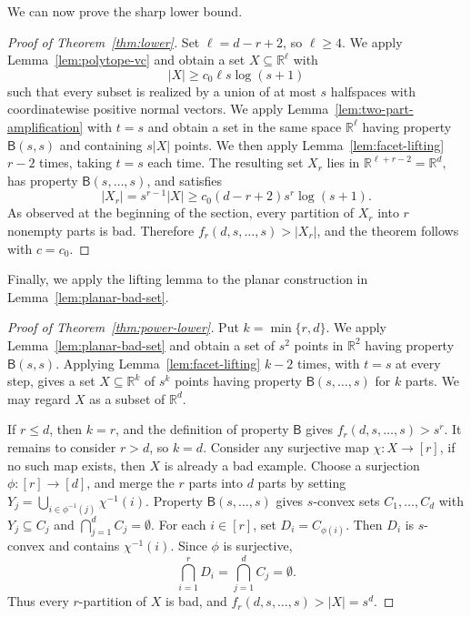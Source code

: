 \documentclass[11pt]{article}
\theoremstyle{definition}
\newcommand*{\abs}[1]{\lvert#1\rvert}
\newcommand{\R}{\mathbb{R}}
\begin{document}
We can now prove the sharp lower bound.

\begin{proof}[Proof of Theorem~\ref{thm:lower}]
Set \(\ell=d-r+2\), so \(\ell\ge4\). We apply Lemma~\ref{lem:polytope-vc} and obtain a set \(X\subseteq\R^{\ell}\) with
\[
\abs{X}\ge c_{0}\ell s\log(s+1)
\]
such that every subset is realized by a union of at most \(s\) halfspaces with coordinatewise positive normal vectors. We apply Lemma~\ref{lem:two-part-amplification} with \(t=s\) and obtain a set in the same space \(\R^{\ell}\) having property \(\mathsf{B}(s,s)\) and containing \(s\abs{X}\) points. We then apply Lemma~\ref{lem:facet-lifting} \(r-2\) times, taking \(t=s\) each time. The resulting set \(X_{r}\) lies in
\(
\R^{\ell+r-2}=\R^{d},
\)
has property \(\mathsf{B}(s,\ldots,s)\), and satisfies
\[
\abs{X_{r}}=s^{r-1}\abs{X}\ge c_{0}(d-r+2)s^{r}\log(s+1).
\]
As observed at the beginning of the section, every partition of \(X_{r}\) into \(r\) nonempty parts is bad. Therefore \(f_{r}(d,s,\ldots,s)>\abs{X_{r}}\), and the theorem follows with \(c=c_{0}\).
\end{proof}

Finally, we apply the lifting lemma to the planar construction in Lemma~\ref{lem:planar-bad-set}.

\begin{proof}[Proof of Theorem~\ref{thm:power-lower}]
Put \(k=\min\{r,d\}\). We apply Lemma~\ref{lem:planar-bad-set} and obtain a set of \(s^{2}\) points in \(\R^{2}\) having property \(\mathsf{B}(s,s)\). Applying Lemma~\ref{lem:facet-lifting} \(k-2\) times, with \(t=s\) at every step, gives a set \(X\subseteq\R^{k}\) of \(s^{k}\) points having property \(\mathsf{B}(s,\ldots,s)\) for \(k\) parts. We may regard \(X\) as a subset of \(\R^{d}\).

If \(r\le d\), then \(k=r\), and the definition of property \(\mathsf{B}\) gives \(f_{r}(d,s,\ldots,s)>s^{r}\). It remains to consider \(r>d\), so \(k=d\). Consider any surjective map \(\chi:X\to[r]\), if no such map exists, then \(X\) is already a bad example. Choose a surjection \(\phi:[r]\to[d]\), and merge the \(r\) parts into \(d\) parts by setting \(Y_{j}=\bigcup_{i\in\phi^{-1}(j)}\chi^{-1}(i)\). Property \(\mathsf{B}(s,\ldots,s)\) gives \(s\)-convex sets \(C_{1},\ldots,C_{d}\) with \(Y_{j}\subseteq C_{j}\) and \(\bigcap_{j=1}^{d}C_{j}=\emptyset\). For each \(i\in[r]\), set \(D_{i}=C_{\phi(i)}\). Then \(D_{i}\) is \(s\)-convex and contains \(\chi^{-1}(i)\). Since \(\phi\) is surjective,
\[
\bigcap_{i=1}^{r}D_{i}=\bigcap_{j=1}^{d}C_{j}=\emptyset.
\]
Thus every \(r\)-partition of \(X\) is bad, and \(f_{r}(d,s,\ldots,s)>\abs{X}=s^{d}\).
\end{proof}
\end{document}
